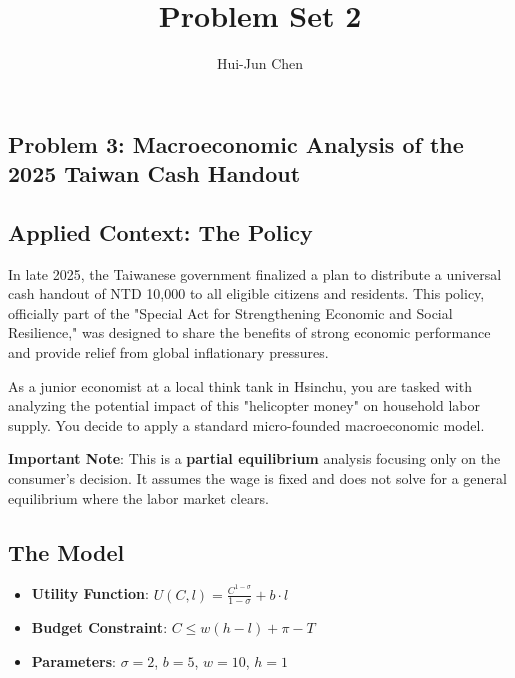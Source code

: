 \documentclass[14pt]{extarticle}
\title{Problem Set 2}
\author{Hui-Jun Chen}
\newcommand{\red}[1]{\textcolor{red}{#1}}
\newcommand{\showAns}{\setboolean{showAns}{true}} %
\begin{document}
\maketitle

\showAns


\begin{Exercise}

\section*{Problem 3: Macroeconomic Analysis of the 2025 Taiwan Cash Handout}

\subsection*{Applied Context: The Policy}
In late 2025, the Taiwanese government finalized a plan to distribute a universal cash handout of NTD 10,000 to all eligible citizens and residents. This policy, officially part of the "Special Act for Strengthening Economic and Social Resilience," was designed to share the benefits of strong economic performance and provide relief from global inflationary pressures.

As a junior economist at a local think tank in Hsinchu, you are tasked with analyzing the potential impact of this "helicopter money" on household labor supply. You decide to apply a standard micro-founded macroeconomic model.

\textbf{Important Note}: This is a \textbf{partial equilibrium} analysis focusing only on the consumer's decision. It assumes the wage is fixed and does not solve for a general equilibrium where the labor market clears.

\subsection*{The Model}
\begin{itemize}
    \item \textbf{Utility Function}: $U(C, l) = \frac{C^{1-\sigma}}{1-\sigma} + b \cdot l$
    \item \textbf{Budget Constraint}: $C \le w(h - l) + \pi - T$
    \item \textbf{Parameters}: $\sigma = 2$, $b = 5$, $w = 10$, $h = 1$
\end{itemize}


\end{Exercise}
\end{document}
